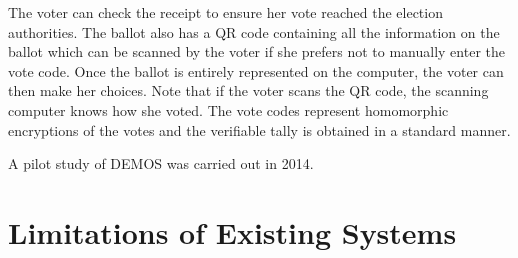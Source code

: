 The voter can check the receipt to ensure her vote reached the
election authorities. The ballot also has a QR code containing all the
information on the ballot which can be scanned by the voter if she
prefers not to manually enter the vote code. Once the ballot is
entirely represented on the computer, the voter can then make her
choices. Note that if the voter scans the QR code, the scanning
computer knows how she voted. The vote codes represent homomorphic
encryptions of the votes and the verifiable tally is obtained in a
standard manner.

A pilot study of DEMOS was carried out in 2014.

\section{Limitations of Existing Systems}
\label{sec:limit-exist-syst}
